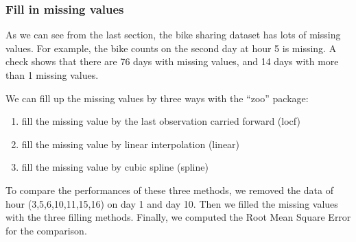 \documentclass[12pt]{article}
\begin{document}
	
	\subsubsection{Fill in missing values}
	As we can see from the last section, the bike sharing dataset has lots of missing values. For example, the bike counts on the second day at hour 5 is missing. A check shows that there are 76 days with missing values, and 14 days with more than 1 missing values. 
	
	We can fill up the missing values by three ways with the ``zoo'' package:
	\begin{enumerate}
		\item fill the missing value by the last observation carried forward (locf)
		
		\item fill the missing value by linear interpolation (linear)
		
		\item fill the missing value by cubic spline (spline)
	\end{enumerate}
	To compare the performances of these three methods, we removed the data of hour (3,5,6,10,11,15,16) on day 1 and day 10. Then we filled the missing values with the three filling methods. Finally, we computed the Root Mean Square Error for the comparison. 
\end{document}
